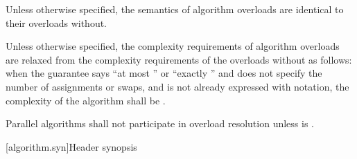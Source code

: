 \pnum
Unless otherwise specified,
the semantics of  algorithm overloads
are identical to their overloads without.

\pnum
Unless otherwise specified,
the complexity requirements of  algorithm overloads
are relaxed from the complexity requirements of the overloads without
as follows:
when the guarantee says ``at most '' or
``exactly ''
and does not specify the number of assignments or swaps, and
 is not already expressed with  \bigoh{} notation,
the complexity of the algorithm shall be .

\pnum
Parallel algorithms shall not participate in overload resolution unless
 is .

[algorithm.syn]{Header  synopsis}
%

